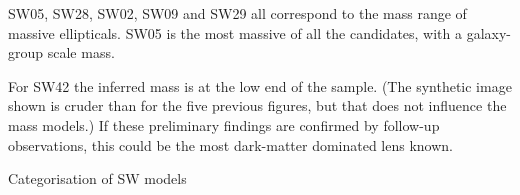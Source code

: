 SW05, SW28, SW02, SW09 and SW29 all correspond to the mass range of
massive ellipticals.  SW05 is the most massive of all the candidates,
with a galaxy-group scale mass.

For SW42 the inferred mass is at the low end of the sample.  (The
synthetic image shown is cruder than for the five previous figures,
but that does not influence the mass models.)  If these preliminary
findings are confirmed by follow-up observations, this could be the
most dark-matter dominated lens known.

\begin{table}
  \caption{Categorisation of SW models}
  \label{tab:models}
  
\end{table}

